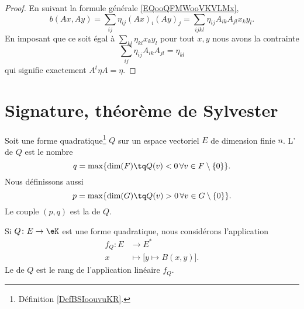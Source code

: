 \begin{proof}
	En suivant la formule générale \eqref{EQooQFMWooVKVLMx},
	\begin{equation}
		b(Ax,Ay)=\sum_{ij} \eta_{ij} (Ax)_i(Ay)_j=\sum_{ijkl}\eta_{ij}A_{ik}A_{jl}x_ky_l.
	\end{equation}
	En imposant que ce soit égal à \( \sum_{kl}\eta_{kl}x_ky_l\) pour tout \( x,y\) nous avons la contrainte
	\begin{equation}
		\sum_{ij}\eta_{ij}A_{ik}A_{jl}=\eta_{kl}
	\end{equation}
	qui signifie exactement \( A^t\eta A=\eta\).
\end{proof}

\section{Signature, théorème de Sylvester}

\begin{definition}       \label{DEFooWDCLooDkRYLK}
	Soit une forme quadratique\footnote{Définition \ref{DefBSIoouvuKR}.} \( Q\) sur un espace vectoriel \( E\) de dimension finie \( n\). L' de \( Q\) est le nombre
	\begin{equation}
		q=\max\{ \dim(F)\tq Q(v)<0\,\forall v\in F\setminus\{ 0 \} \}.
	\end{equation}
	Nous définissons aussi
	\begin{equation}
		p=\max\{ \dim(G)\tq Q(v)>0\,\forall v\in G\setminus\{ 0 \} \}.
	\end{equation}
	Le couple \( (p,q)\) est la  de \( Q\).
\end{definition}

\begin{definition}        \label{DEFooVITQooQaMaTF}
	Si \( Q\colon E\to \eK\) est une forme quadratique, nous considérons l'application
	\begin{equation}
		\begin{aligned}
			f_Q\colon E & \to E^*                              \\
			x           & \mapsto \big[ y\mapsto B(x,y) \big].
		\end{aligned}
	\end{equation}
	Le  de \( Q\) est le rang de l'application linéaire \( f_Q\).
\end{definition}

